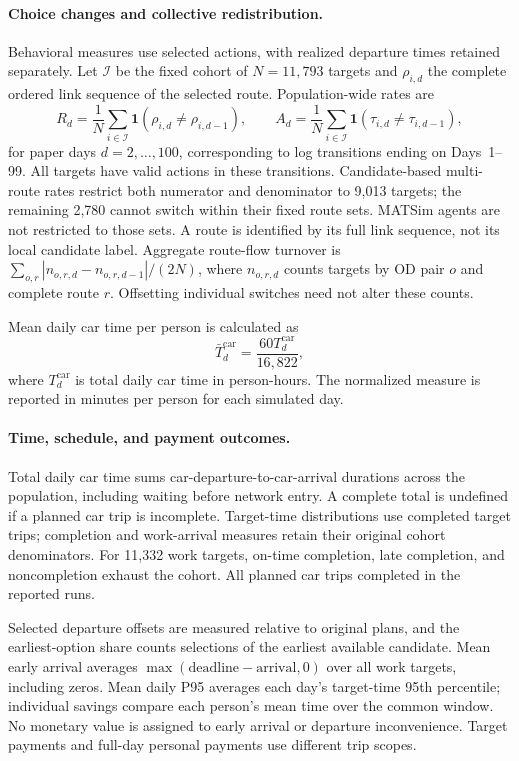 \paragraph{Choice changes and collective redistribution.}
Behavioral measures use selected actions, with realized departure times retained separately. Let $\mathcal{I}$ be the fixed cohort of $N=11{,}793$ targets and $\rho_{i,d}$ the complete ordered link sequence of the selected route. Population-wide rates are
\begin{equation}
 R_d=\frac{1}{N}\sum_{i\in\mathcal{I}}\mathbf{1}(\rho_{i,d}\ne\rho_{i,d-1}),
 \qquad
 A_d=\frac{1}{N}\sum_{i\in\mathcal{I}}\mathbf{1}(\tau_{i,d}\ne\tau_{i,d-1}),
 \label{eq:behavioral-adjustments}
\end{equation}
for paper days $d=2,\ldots,100$, corresponding to log transitions ending on Days~1--99. All targets have valid actions in these transitions. Candidate-based multi-route rates restrict both numerator and denominator to 9,013 targets; the remaining 2,780 cannot switch within their fixed route sets. MATSim agents are not restricted to those sets. A route is identified by its full link sequence, not its local candidate label. Aggregate route-flow turnover is $\sum_{o,r}|n_{o,r,d}-n_{o,r,d-1}|/(2N)$, where $n_{o,r,d}$ counts targets by OD pair $o$ and complete route $r$. Offsetting individual switches need not alter these counts.

Mean daily car time per person is calculated as
\[
\bar{T}^{\mathrm{car}}_d
=
\frac{60 T^{\mathrm{car}}_d}{16{,}822},
\]
where $T^{\mathrm{car}}_d$ is total daily car time in
person-hours. The normalized measure is reported in
minutes per person for each simulated day.

\paragraph{Time, schedule, and payment outcomes.}
Total daily car time sums car-departure-to-car-arrival durations across the population, including waiting before network entry. A complete total is undefined if a planned car trip is incomplete. Target-time distributions use completed target trips; completion and work-arrival measures retain their original cohort denominators. For 11,332 work targets, on-time completion, late completion, and noncompletion exhaust the cohort. All planned car trips completed in the reported runs.

Selected departure offsets are measured relative to original plans, and the earliest-option share counts selections of the earliest available candidate. Mean early arrival averages $\max(\mathrm{deadline}-\mathrm{arrival},0)$ over all work targets, including zeros. Mean daily P95 averages each day's target-time 95th percentile; individual savings compare each person's mean time over the common window. No monetary value is assigned to early arrival or departure inconvenience. Target payments and full-day personal payments use different trip scopes.

